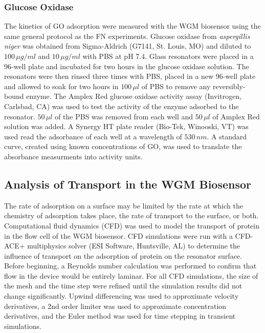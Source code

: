 \subsubsection{Glucose Oxidase}

The kinetics of GO adsorption were measured with the WGM biosensor
using the same general protocol as the FN experiments. Glucose oxidase
from \emph{aspergillis niger} was obtained from Sigma-Aldrich (G7141,
St. Louis, MO) and diluted to $100\,\mu g/ml$ and $10\,\mu g/ml$
with PBS at pH 7.4. Glass resonators were placed in a 96-well plate
and incubated for two hours in the glucose oxidase solution. The resonators
were then rinsed three times with PBS, placed in a new 96-well plate
and allowed to soak for two hours in $100\,\mu l$ of PBS to remove
any reversibly-bound enzyme. The Amplex Red glucose oxidase activity
assay (Invitrogen, Carlsbad, CA) was used to test the activity of
the enzyme adsorbed to the resonator. $50\,\mu l$ of the PBS was
removed from each well and $50\,\mu l$ of Amplex Red solution was
added. A Synergy HT plate reader (Bio-Tek, Winooski, VT) was used
read the adsorbance of each well at a wavelength of $530\, nm$. A
standard curve, created using known concentrations of GO, was used
to translate the absorbance measurments into activity units.


\subsection{Analysis of Transport in the WGM Biosensor}

The rate of adsorption on a surface may be limited by the rate at
which the chemistry of adsorption takes place, the rate of transport
to the surface, or both. Computational fluid dynamics (CFD) was used
to model the transport of protein in the flow cell of the WGM biosensor.
CFD simulations were run with a CFD-ACE+ multiphysics solver (ESI
Software, Huntsville, AL) to determine the influence of transport
on the adsorption of protein on the resonator surface. Before beginning,
a Reynolds number calculation was performed to confirm that flow in
the device would be entirely laminar. For all CFD simulations, the
size of the mesh and the time step were refined until the simulation
results did not change significantly. Upwind differencing was used
to approximate velocity derivatives, a 2nd order limiter was used
to approximate concentration derivatives, and the Euler method was
used for time stepping in transient simulations. 

